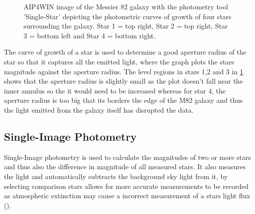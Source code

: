 \documentclass[12pt]{article}
\begin{document}
\begin{figure}[H]
\begin{multicols}{2}
\end{multicols}
\caption{AIP4WIN image of the Messier 82 galaxy with the photometry tool 'Single-Star' depicting the photometric curves of growth of four stars surrounding the galaxy. Star 1 = top right, Star 2 = top right, Star 3 = bottom left and Star 4 = bottom right.}
\label{SS-Growth}
\end{figure}

The curve of growth of a star is used to determine a good aperture radius of the star so that it captures all the emitted light, where the graph plots the stars magnitude against the aperture radius. The level regions in stars 1,2 and 3 in \cref{SS-Growth} shows that the aperture radius is slightly small as the plot doesn't fall near the inner annulus so the it would need to be increased whereas for star 4, the aperture radius is too big that its borders the edge of the M82 galaxy and thus the light emitted from the galaxy itself has disrupted the data. 

\subsection{Single-Image Photometry}
\label{SubSection 2b}

Single-Image photometry is used to calculate the magnitudes of two or more stars and thus also the difference in magnitude of all measured stars. It also measures the light and automatically subtracts the background sky light from it, by selecting comparison stars allows for more accurate measurements to be recorded as atmospheric extinction may cause a incorrect measurement of a stars light flux  (\cite{ImageProcessingTutorial}). \\
\end{document}
